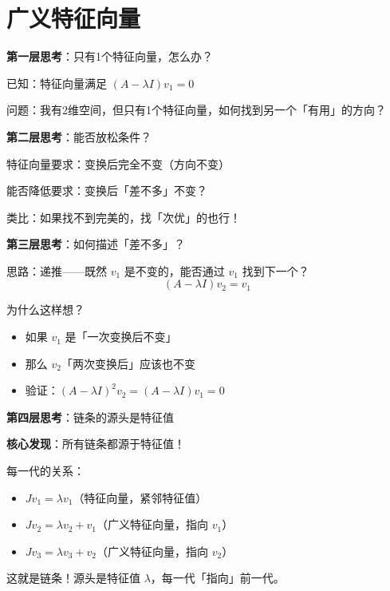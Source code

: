 \documentclass[aspectratio=169,12pt]{beamer}
\begin{document}
\section{广义特征向量}

\begin{frame}
\fontsize{10}{12}\selectfont
\centerline{\textbf{第一层思考}：只有1个特征向量，怎么办？}

\bigskip
已知：特征向量满足 $(A-\lambda I)v_1 = 0$

\bigskip
问题：我有2维空间，但只有1个特征向量，如何找到另一个「有用」的方向？
\end{frame}

\begin{frame}
\fontsize{10}{12}\selectfont
\centerline{\textbf{第二层思考}：能否放松条件？}

\bigskip
特征向量要求：变换后完全不变（方向不变）

\bigskip
能否降低要求：变换后「差不多」不变？

\bigskip
\pause
类比：如果找不到完美的，找「次优」的也行！
\end{frame}

\begin{frame}
\fontsize{10}{12}\selectfont
\centerline{\textbf{第三层思考}：如何描述「差不多」？}

\bigskip
思路：递推——既然 $v_1$ 是不变的，能否通过 $v_1$ 找到下一个？
\[
(A-\lambda I)v_2 = v_1
\]

\pause
\bigskip
为什么这样想？
\begin{itemize}
    \item 如果 $v_1$ 是「一次变换后不变」
    \item 那么 $v_2$「两次变换后」应该也不变
    \item 验证：$(A-\lambda I)^2 v_2 = (A-\lambda I)v_1 = 0$
\end{itemize}
\end{frame}

\begin{frame}
\fontsize{10}{12}\selectfont
\centerline{\textbf{第四层思考}：链条的源头是特征值}

\bigskip
\centerline{\textbf{核心发现}：所有链条都源于特征值！}

\bigskip
每一代的关系：
\begin{itemize}
    \item $J v_1 = \lambda v_1$（特征向量，紧邻特征值）
    \item $J v_2 = \lambda v_2 + v_1$（广义特征向量，指向 $v_1$）
    \item $J v_3 = \lambda v_3 + v_2$（广义特征向量，指向 $v_2$）
\end{itemize}

\pause
\bigskip
这就是链条！源头是特征值 $\lambda$，每一代「指向」前一代。
\end{frame}
\end{document}
